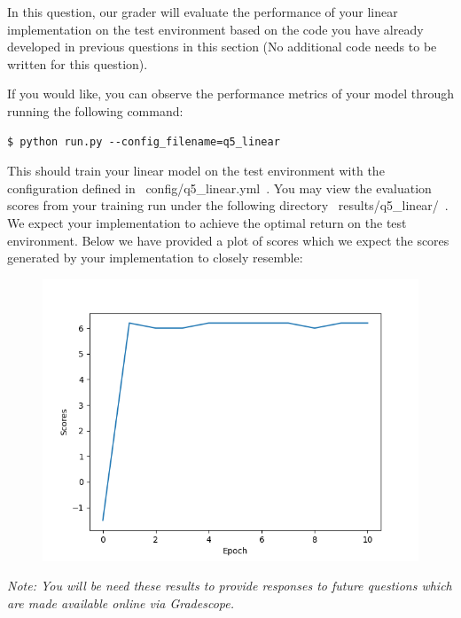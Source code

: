 \item {}

In this question, our grader will evaluate the performance of your linear implementation on the test environment based on the code you have already developed in previous questions in this section (No additional code needs to be written for this question).

If you would like, you can observe the performance metrics of your model through running the following command:

\begin{lstlisting}
$ python run.py --config_filename=q5_linear
\end{lstlisting}

This should train your linear model on the test environment with the configuration defined in ~config/q5_linear.yml~. You may view the evaluation scores from your training run under the following directory ~results/q5_linear/~. We expect your implementation to achieve the optimal return on the test environment. Below we have provided a plot of scores which we expect the scores generated by your implementation to closely resemble:

\begin{figure}[H]
\centering
  \includegraphics[width=.5\linewidth]{images/linear_test.png}
\end{figure}

\textit{Note: You will be need these results to provide responses to future questions which are made available online via Gradescope.}
\clearpage